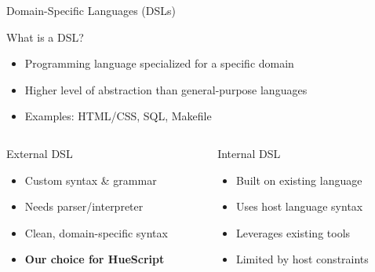 \documentclass{beamer}
\begin{document}
\begin{frame}{Domain-Specific Languages (DSLs)}
\begin{block}{What is a DSL?}
\begin{itemize}
    \item Programming language specialized for a specific domain
    \item Higher level of abstraction than general-purpose languages
    \item Examples: HTML/CSS, SQL, Makefile
\end{itemize}
\end{block}

\begin{columns}
\begin{column}{0.5\textwidth}
\begin{block}{External DSL}
\begin{itemize}
    \item Custom syntax \& grammar
    \item Needs parser/interpreter
    \item Clean, domain-specific syntax
    \item \textbf{Our choice for HueScript}
\end{itemize}
\end{block}
\end{column}
\begin{column}{0.5\textwidth}
\begin{block}{Internal DSL}
\begin{itemize}
    \item Built on existing language
    \item Uses host language syntax
    \item Leverages existing tools
    \item Limited by host constraints
\end{itemize}
\end{block}
\end{column}
\end{columns}
\end{frame}
\end{document}
